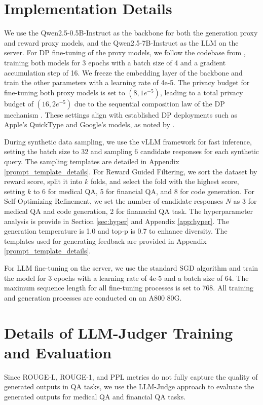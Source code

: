 \section{Implementation Details}
\label{app:imple_details}
We use the Qwen2.5-0.5B-Instruct \cite{yang2024qwen2} as the backbone for both the generation proxy and reward proxy models, and the Qwen2.5-7B-Instruct as the LLM on the server. 
For DP fine-tuning of the proxy models, we follow the codebase from \citet{li2024privlmbench}, training both models for 3 epochs with a batch size of 4 and a gradient accumulation step of 16. We freeze the embedding layer of the backbone and train the other parameters with a learning rate of 4e-5. 
The privacy budget for fine-tuning both proxy models is set to $(8, 1e^{-5})$, leading to a total privacy budget of $(16, 2e^{-5})$ due to the sequential composition law of the DP mechanism \cite{Abadi2016DeepLDP}. 
These settings align with established DP deployments such as Apple's QuickType and Google's models, as noted by \citet{Nils2023ana}.

During synthetic data sampling, we use the vLLM framework \cite{kwon2023efficient} for fast inference, setting the batch size to 32 and sampling 6 candidate responses for each synthetic query. 
The sampling templates are detailed in Appendix \ref{prompt_template_details}. 
For Reward Guided Filtering, we sort the dataset by reward score, split it into $k$ folds, and select the fold with the highest score, setting $k$ to 6 for medical QA, 5 for financial QA, and 8 for code generation. 
For Self-Optimizing Refinement, we set the number of candidate responses $N$ as 3 for medical QA and code generation, 2 for finanacial QA task.
The hyperparameter analysis is provide in Section \ref{sec:hyper} and Appendix \ref{app:hyper}.
The generation temperature is 1.0 and top-p is 0.7 to enhance diversity. The templates used for generating feedback are provided in Appendix \ref{prompt_template_details}.

For LLM fine-tuning on the server, we use the standard SGD algorithm and train the model for 3 epochs with a learning rate of 4e-5 and a batch size of 64. 
The maximum sequence length for all fine-tuning processes is set to 768. All training and generation processes are conducted on an A800 80G.




\section{Details of LLM-Judger Training and Evaluation}
\label{app:llm_judge}
Since ROUGE-L, ROUGE-1, and PPL metrics do not fully capture the quality of generated outputs in QA tasks, we use the LLM-Judge \cite{Lia2023judging} approach to evaluate the generated outputs for medical QA and financial QA tasks.

